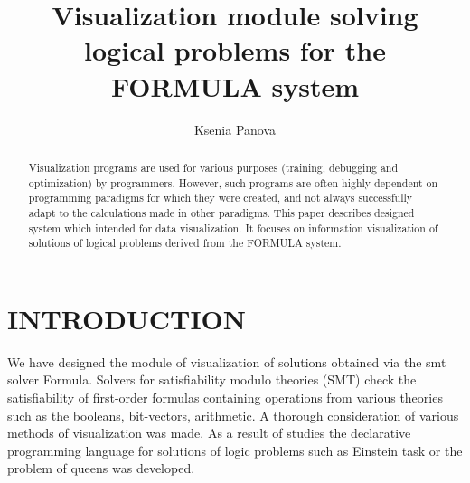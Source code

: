 \documentclass[a4paper, 10pt, conference]{ieeeconf}
\title{\LARGE \bf
Visualization module solving logical problems for the FORMULA system
}
\author{Ksenia Panova%
}
\begin{document}
\maketitle
\thispagestyle{empty}
\pagestyle{empty}



\begin{abstract}
Visualization programs are used for various purposes (training, debugging and optimization) by programmers. However, such programs are often highly dependent on programming paradigms for which they were created, and not always successfully adapt to the calculations made in other paradigms. This paper describes designed system which intended for data visualization. It focuses on information visualization of solutions of logical problems derived from the FORMULA system.
\end{abstract}

\section{INTRODUCTION}

We have designed the module of visualization of solutions obtained via the smt solver Formula. Solvers for satisfiability modulo theories (SMT) check the satisfiability of first-order formulas containing operations from various theories such as the booleans, bit-vectors, arithmetic. A thorough consideration of various methods of visualization was made. As a result of studies the declarative programming language for solutions of logic problems such as Einstein task or the problem of queens was developed.
\end{document}
